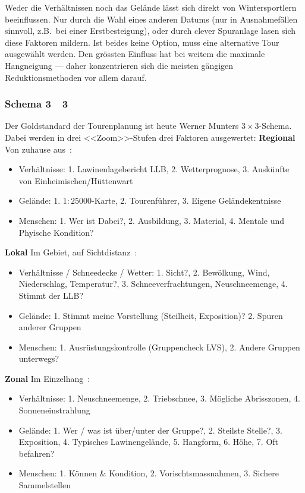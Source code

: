 \begin{multicols}{2}
Weder die Verhältnissen noch das Gelände lässt sich direkt von Wintersportlern beeinflussen. Nur durch die Wahl eines anderen Datums (nur in Ausnahmefällen sinnvoll, z.B.\ bei einer Erstbesteigung), oder durch clever Spuranlage lasen sich diese Faktoren mildern. 
Ist beides keine Option, muss eine alternative Tour ausgewählt werden.
Den grössten Einfluss hat bei weitem die maximale Hangneigung --- daher konzentrieren sich die meisten gängigen Reduktionsmethoden vor allem darauf.

\subsubsection{Schema 3~\texttimes~3}
Der Goldstandard der Tourenplanung ist heute Werner Munters $3\times3$-Schema. Dabei werden in drei <<Zoom>>-Stufen drei Faktoren ausgewertet:
\textbf{Regional} 
Von zuhause aus~\cite{munter}:
\begin{itemize}
  \item Verhältnisse: 1. Lawinenlagebericht LLB, 2. Wetterprognose, 3. Auskünfte von Einheimischen/Hüttenwart
  \item Gelände: 1. $1:25000$-Karte, 2. Tourenführer, 3. Eigene Geländekentnisse
  \item Menschen: 1. Wer ist Dabei?, 2. Ausbildung, 3. Material, 4. Mentale und Phyische Kondition? 
\end{itemize}

\textbf{Lokal} Im Gebiet, auf Sichtdistanz~\cite{munter}\cite{redbull3x3}:
\begin{itemize}
  \item Verhältnisse / Schneedecke / Wetter: 1. Sicht?, 2. Bewölkung, Wind, Niederschlag, Temperatur?, 3. Schneeverfrachtungen, Neuschneemenge, 4. Stimmt der LLB?\
  \item Gelände: 1. Stimmt meine Vorstellung (Steilheit, Exposition)? 2. Spuren anderer Gruppen
  \item Menschen: 1. Ausrüstungskontrolle (Gruppencheck LVS), 2. Andere Gruppen unterwegs?
\end{itemize}
\textbf{Zonal} Im Einzelhang~\cite{munter}\cite{redbull3x3}:
\begin{itemize}
  \item Verhältnisse: 1. Neuschneemenge, 2. Triebschnee, 3. Mögliche Abrisszonen, 4. Sonneneinstrahlung
  \item Gelände: 1. Wer / was ist über/unter der Gruppe?, 2. Steilste Stelle?, 3. Exposition, 4. Typisches Lawinengelände, 5. Hangform, 6. Höhe, 7. Oft befahren?
  \item Menschen: 1. Können \& Kondition, 2. Vorischtsmassnahmen, 3. Sichere Sammelstellen
\end{itemize}


\end{multicols}
